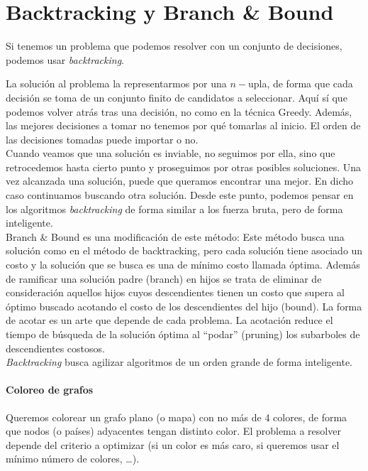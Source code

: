 \chapter{Backtracking y Branch \& Bound}
Si tenemos un problema que podemos resolver con un conjunto de decisiones, podemos usar \emph{backtracking}.

La solución al problema la representarmos por una $n-$upla, de forma que cada decisión se toma de un conjunto finito de candidatos a seleccionar. Aquí sí que podemos volver atrás tras una decisión, no como en la técnica Greedy. Además, las mejores decisiones a tomar no tenemos por qué tomarlas al inicio. El orden de las decisiones tomadas puede importar o no.\\

Cuando veamos que una solución es inviable, no seguimos por ella, sino que retrocedemos hasta cierto punto y proseguimos por otras posibles soluciones. Una vez alcanzada una solución, puede que queramos encontrar una mejor. En dicho caso continuamos buscando otra solución. Desde este punto, podemos pensar en los algoritmos \emph{backtracking} de forma similar a los fuerza bruta, pero de forma inteligente.\\

Branch \& Bound es una modificación de este método:
Este método busca una solución como en el método de backtracking, pero cada solución tiene asociado un costo y la solución que se busca es una de mínimo costo llamada óptima. Además de ramificar una solución padre (branch) en hijos se trata de eliminar de consideración aquellos hijos cuyos descendientes tienen un costo que supera al óptimo buscado acotando el costo de los descendientes del hijo (bound). La forma de acotar es un arte que depende de cada problema. La acotación reduce el tiempo de búsqueda de la solución óptima al ``podar'' (pruning) los subarboles de descendientes costosos.\\

\emph{Backtracking} busca agilizar algoritmos de un orden grande de forma inteligente.

\subsubsection{Coloreo de grafos}
Queremos colorear un grafo plano (o mapa) con no más de 4 colores, de forma que nodos (o países) adyacentes tengan distinto color. El problema a resolver depende del criterio a optimizar (si un color es más caro, si queremos usar el mínimo número de colores, \ldots).

